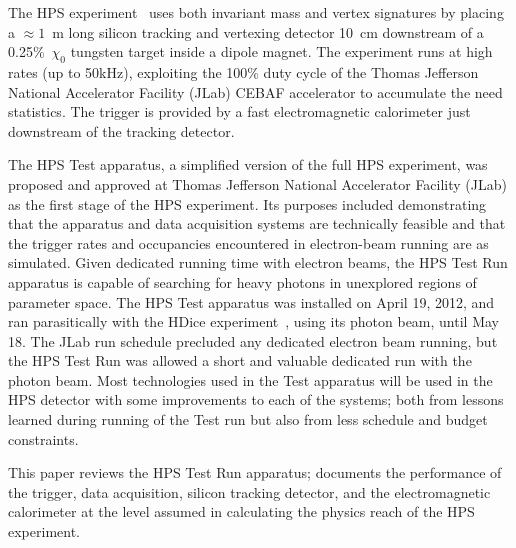 \documentclass[final,3p,times,twocolumn]{elsarticle}
\newcommand{\ee}{e$^+$e$^-$}
\begin{document}
The HPS experiment~\cite{HPS_proposal_2010} uses both invariant mass and 
vertex signatures by placing a $\approx 1$~m long silicon tracking and vertexing detector 10~cm 
downstream  of a 0.25\%~$\chi_0$ tungsten target inside a dipole magnet. The experiment runs at high 
rates (up to 50kHz), exploiting the 
100\% duty cycle of the Thomas Jefferson National Accelerator Facility (JLab) CEBAF accelerator to 
accumulate the need statistics. The trigger is provided by a fast electromagnetic calorimeter just 
downstream of the tracking detector. 


The HPS Test apparatus, a simplified version of the full HPS experiment, was proposed and 
approved at Thomas Jefferson National Accelerator Facility (JLab) as the first stage of the HPS 
experiment. Its purposes included demonstrating that the apparatus and data acquisition systems are 
technically feasible and that the trigger rates and occupancies encountered in electron-beam 
running are as simulated. Given dedicated running time with electron beams, the HPS Test Run 
apparatus is capable of searching for heavy photons in unexplored regions of parameter space.    
The HPS Test apparatus was installed on April 19, 2012, and ran parasitically with the HDice 
experiment~\cite{HDice}, using its photon beam, until May 18. The JLab run schedule 
precluded any dedicated electron beam running, but the HPS Test Run was allowed a short and 
valuable dedicated run with the photon beam. Most technologies used in the Test apparatus will 
be used in the HPS detector with some improvements to each of the systems; both from lessons 
learned during running of the Test run but also from less schedule and budget constraints. 

This paper reviews the HPS Test Run apparatus; documents the performance of the trigger, 
data acquisition, silicon tracking detector, and the electromagnetic calorimeter at the level assumed 
in calculating the physics reach of the HPS experiment. 




\end{document}
